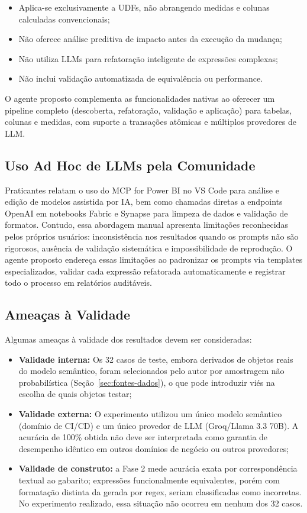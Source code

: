 \documentclass[
    12pt,               %
    openright,          %
    oneside,            %
    a4paper,            %
    chapter=TITLE,      %
    section=TITLE,      %
    brazil              %
]{abntex2}
\begin{document}
\begin{itemize}
    \item Aplica-se exclusivamente a UDFs, não abrangendo medidas e colunas calculadas convencionais;
    \item Não oferece análise preditiva de impacto antes da execução da mudança;
    \item Não utiliza LLMs para refatoração inteligente de expressões complexas;
    \item Não inclui validação automatizada de equivalência ou performance.
\end{itemize}

O agente proposto complementa as funcionalidades nativas ao oferecer um pipeline completo (descoberta, refatoração, validação e aplicação) para tabelas, colunas e medidas, com suporte a transações atômicas e múltiplos provedores de LLM.

\subsection{Uso Ad Hoc de LLMs pela Comunidade}

Praticantes relatam o uso do MCP for Power BI no VS Code para análise e edição de modelos assistida por IA, bem como chamadas diretas a endpoints OpenAI em notebooks Fabric e Synapse para limpeza de dados e validação de formatos. Contudo, essa abordagem manual apresenta limitações reconhecidas pelos próprios usuários: inconsistência nos resultados quando os prompts não são rigorosos, ausência de validação sistemática e impossibilidade de reprodução. O agente proposto endereça essas limitações ao padronizar os prompts via templates especializados, validar cada expressão refatorada automaticamente e registrar todo o processo em relatórios auditáveis.

\subsection{Ameaças à Validade}

Algumas ameaças à validade dos resultados devem ser consideradas:

\begin{itemize}
    \item \textbf{Validade interna:} Os 32 casos de teste, embora derivados de objetos reais do modelo semântico, foram selecionados pelo autor por amostragem não probabilística (Seção~\ref{sec:fontes-dados}), o que pode introduzir viés na escolha de quais objetos testar;
    \item \textbf{Validade externa:} O experimento utilizou um único modelo semântico (domínio de CI/CD) e um único provedor de LLM (Groq/Llama 3.3 70B). A acurácia de 100\% obtida não deve ser interpretada como garantia de desempenho idêntico em outros domínios de negócio ou outros provedores;
    \item \textbf{Validade de construto:} a Fase 2 mede acurácia exata por correspondência textual ao gabarito; expressões funcionalmente equivalentes, porém com formatação distinta da gerada por regex, seriam classificadas como incorretas. No experimento realizado, essa situação não ocorreu em nenhum dos 32 casos.
\end{itemize}
\end{document}
